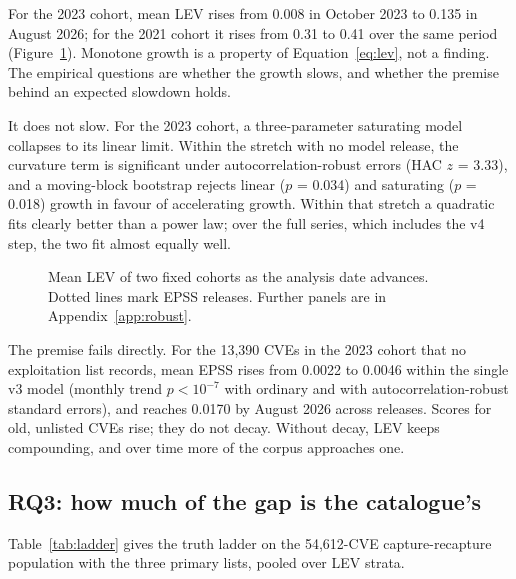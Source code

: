 For the 2023 cohort, mean LEV rises from 0.008 in October 2023 to 0.135 in
August 2026; for the 2021 cohort it rises from 0.31 to 0.41 over the same
period (Figure~\ref{fig:sweep}). Monotone growth is a property of
Equation~\eqref{eq:lev}, not a finding. The empirical questions are whether the
growth slows, and whether the premise behind an expected slowdown holds.

It does not slow. For the 2023 cohort, a three-parameter saturating model
collapses to its linear limit. Within the stretch with no model release, the
curvature term is significant under autocorrelation-robust errors (HAC
$z$ = 3.33), and a moving-block bootstrap rejects linear ($p$ = 0.034) and
saturating ($p$ = 0.018) growth in favour of accelerating growth. Within that
stretch a quadratic fits clearly better than a power law; over the full series,
which includes the v4 step, the two fit almost equally well.

\begin{figure}[t]
\centering
{}
\caption{Mean LEV of two fixed cohorts as the analysis date advances. Dotted
lines mark EPSS releases. Further panels are in Appendix~\ref{app:robust}.}\label{fig:sweep}
\end{figure}

The premise fails directly. For the 13,390 CVEs in the 2023 cohort that no
exploitation list records, mean EPSS rises from 0.0022 to 0.0046 within the
single v3 model (monthly trend $p < 10^{-7}$ with ordinary and with
autocorrelation-robust standard errors), and reaches 0.0170
by August 2026 across releases. Scores for old, unlisted CVEs rise; they do not
decay. Without decay, LEV keeps compounding, and over time more of the corpus
approaches one.


\subsection{RQ3: how much of the gap is the catalogue's}\label{sec:res-cr}

Table~\ref{tab:ladder} gives the truth ladder on the 54,612-CVE
capture-recapture population with the three primary lists, pooled over LEV
strata.

